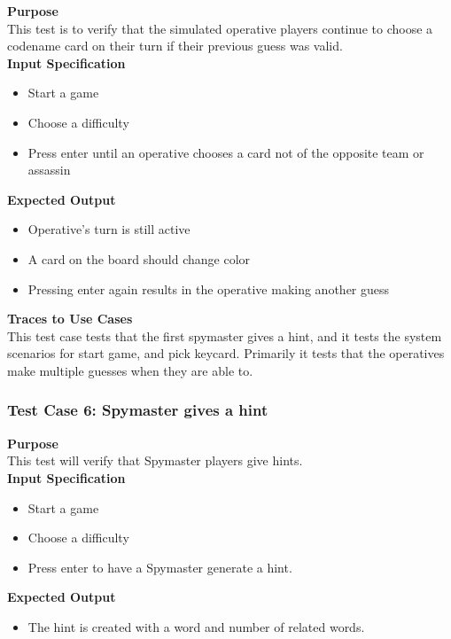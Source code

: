 \documentclass[12pt]{article}
\begin{document}
\noindent
{\bf Purpose}\\
This test is to verify that the simulated operative players continue to choose a codename card on their turn if their previous guess was valid. \\

\noindent
{\bf Input Specification}
\begin{itemize}
    \item Start a game
    \item Choose a difficulty
    \item Press enter until an operative chooses a card not of the opposite team or assassin
\end{itemize}

\noindent
{\bf Expected Output}
\begin{itemize}
    \item Operative's turn is still active
    \item A card on the board should change color
    \item Pressing enter again results in the operative making another guess
    
\end{itemize}

\noindent
{\bf Traces to Use Cases}\\
This test case tests that the first spymaster gives a hint, and it tests the system scenarios for start game, and pick keycard. Primarily it tests that the operatives make multiple guesses when they are able to. \\

\subsubsection{Test Case 6: Spymaster gives a hint} \label{tc:2}

\noindent
{\bf Purpose}\\
This test will verify that Spymaster players give hints. \\

\noindent
{\bf Input Specification}
\begin{itemize}
    \item Start a game
    \item Choose a difficulty
    \item Press enter to have a Spymaster generate a hint.
\end{itemize}

\noindent
{\bf Expected Output}
\begin{itemize}
    \item The hint is created with a word and number of related words.
\end{itemize}
\end{document}
